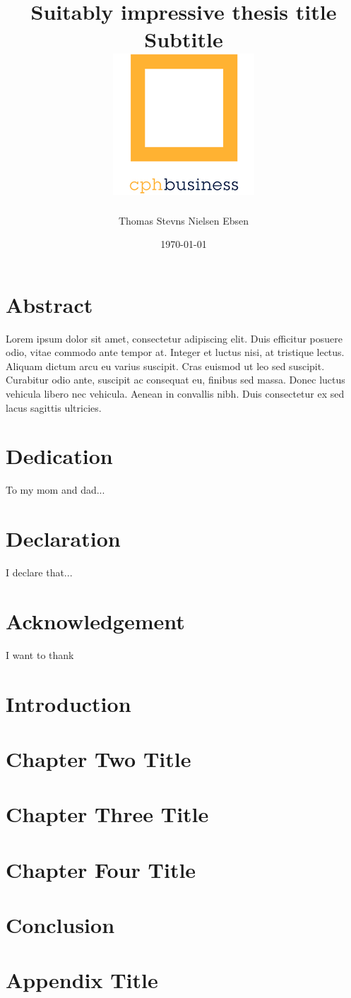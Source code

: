 \documentclass[12pt]{report}
\title{
    {Suitably impressive thesis title}\\
    {\large Subtitle}\\
    {\includegraphics{cphbusiness-small.png}}
}
\author{Thomas Stevns Nielsen Ebsen}
\date{\today}
\begin{document}
\maketitle

\chapter*{Abstract}
Lorem ipsum dolor sit amet, consectetur adipiscing elit. Duis efficitur posuere odio, vitae commodo ante tempor at. Integer et luctus nisi, at tristique lectus. Aliquam dictum arcu eu varius suscipit. Cras euismod ut leo sed suscipit. Curabitur odio ante, suscipit ac consequat eu, finibus sed massa. Donec luctus vehicula libero nec vehicula. Aenean in convallis nibh. Duis consectetur ex sed lacus sagittis ultricies.

\chapter*{Dedication}
To my mom and dad...

\chapter*{Declaration}
I declare that...

\chapter*{Acknowledgement}
I want to thank

\tableofcontents
\listoffigures
\listoftables

\chapter{Introduction}


\chapter{Chapter Two Title}


\chapter{Chapter Three Title}


\chapter{Chapter Four Title}


\chapter{Conclusion}


\appendix
\chapter{Appendix Title}

\end{document}
